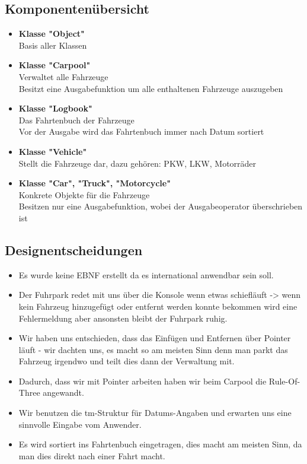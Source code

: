\subsection{Komponentenübersicht}

\begin{itemize}

\item \textbf{Klasse \string"Object"} \\
Basis aller Klassen

\item \textbf{Klasse "Carpool"}
\\ Verwaltet alle Fahrzeuge
\\ Besitzt eine Ausgabefunktion um alle enthaltenen Fahrzeuge auszugeben

\item \textbf{Klasse "Logbook"}
\\ Das Fahrtenbuch der Fahrzeuge
\\ Vor der Ausgabe wird das Fahrtenbuch immer nach Datum sortiert

\item \textbf{Klasse "Vehicle"}
\\ Stellt die Fahrzeuge dar, dazu gehören: PKW, LKW, Motorräder

\item \textbf{Klasse "Car", "Truck", "Motorcycle"}
\\ Konkrete Objekte für die Fahrzeuge
\\ Besitzen nur eine Ausgabefunktion, wobei der Ausgabeoperator überschrieben ist

\end{itemize}

\subsection{Designentscheidungen}
\begin{itemize}
\item Es wurde keine EBNF erstellt da es international anwendbar sein soll. 
\item Der Fuhrpark redet mit uns über die Konsole wenn etwas schiefläuft -> wenn kein Fahrzeug hinzugefügt oder entfernt werden konnte bekommen wird eine Fehlermeldung aber ansonsten bleibt der Fuhrpark ruhig. 
\item Wir haben uns entschieden, dass das Einfügen und Entfernen über Pointer läuft - wir dachten uns, es macht so am meisten Sinn denn man parkt das Fahrzeug irgendwo und teilt dies dann der Verwaltung mit. 
\item Dadurch, dass wir mit Pointer arbeiten haben wir beim Carpool die Rule-Of-Three angewandt. 
\item Wir benutzen die tm-Struktur für Datums-Angaben und erwarten uns eine sinnvolle Eingabe vom Anwender. 
\item Es wird sortiert ins Fahrtenbuch eingetragen, dies macht am meisten Sinn, da man dies direkt nach einer Fahrt macht. 
\end{itemize}

